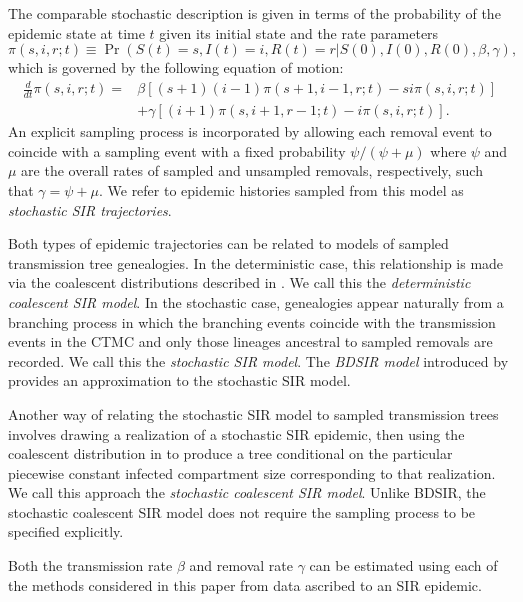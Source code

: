 \documentclass[12pt,titlepage]{article}
\begin{document}
The comparable stochastic description is given in terms of the probability
of the epidemic state at time $t$ given its initial state and the rate parameters
\begin{equation}
\pi(s,i,r;t) \equiv \Pr(S(t)=s, I(t)=i, R(t)=r|S(0),I(0),R(0),\beta,\gamma),
\end{equation}
which is governed by the following equation of motion:
\begin{align}
\frac{d}{dt}\pi(s,i,r;t)=&\beta\left[(s+1)(i-1)\pi(s+1,i-1,r;t)-si\pi(s,i,r;t)\right]\nonumber\\
&+\gamma\left[(i+1)\pi(s,i+1,r-1;t)-i\pi(s,i,r;t)\right].
\label{eq:SIRME}
\end{align}
An explicit sampling process is incorporated by allowing each removal
event to coincide with a sampling event with a fixed probability
$\psi/(\psi+\mu)$ where $\psi$ and $\mu$ are the overall rates of
sampled and unsampled removals, respectively, such that
$\gamma=\psi+\mu$. We refer to epidemic histories sampled from this
model as \emph{stochastic SIR trajectories}.

Both types of epidemic trajectories can be related to models of sampled transmission tree
genealogies. In the deterministic case, this relationship is made via
the coalescent distributions described in %
\cite{Volz:2012}. We call this the
\emph{deterministic coalescent SIR model}.  In the stochastic case,
genealogies appear naturally from a branching process in which the
branching events coincide with the transmission events in the CTMC and
only those lineages ancestral to sampled removals are recorded. We
call this the \emph{stochastic SIR model}.  The \emph{BDSIR model} introduced by
\cite{Kuhnert:2014} provides an approximation to the stochastic
SIR model.

Another way of relating the stochastic SIR model to sampled
transmission trees involves drawing a realization of a stochastic SIR
epidemic, then using the coalescent distribution in \cite{Volz:2012} to
produce a tree conditional on the particular piecewise constant
infected compartment size corresponding to that realization.  We call
this approach the \emph{stochastic coalescent SIR model}.  Unlike BDSIR, the stochastic 
coalescent SIR model does not require the sampling process to be specified explicitly.

Both the transmission rate $\beta$ and removal rate $\gamma$ can be
estimated using each of the methods considered in this paper from data
ascribed to an SIR epidemic.
\end{document}

